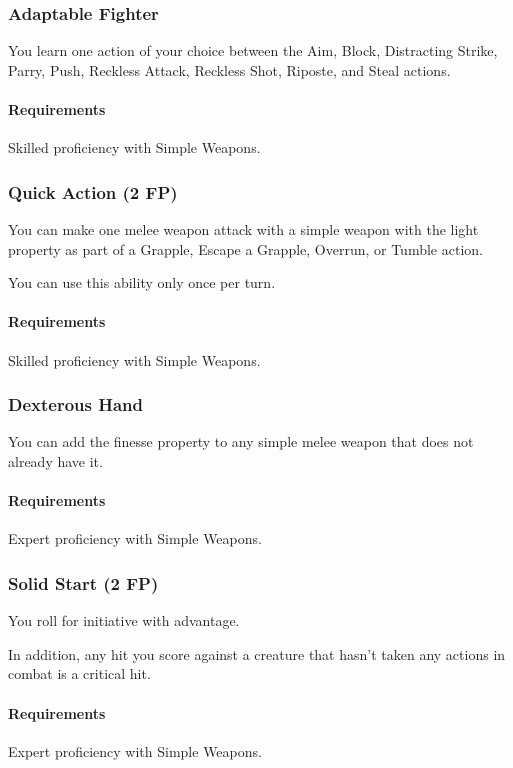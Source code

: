 \subsubsection{Adaptable Fighter} \label{feat::adaptablefighter}
    You learn one action of your choice between the Aim, Block, Distracting Strike, Parry, Push, Reckless Attack, Reckless Shot, Riposte, and Steal actions.
    \paragraph{Requirements} Skilled proficiency with Simple Weapons.
\subsubsection{Quick Action (2 FP)} \label{feat::quickaction}
    You can make one melee weapon attack with a simple weapon with the light property as part of a Grapple, Escape a Grapple, Overrun, or Tumble action.

    You can use this ability only once per turn.
    \paragraph{Requirements} Skilled proficiency with Simple Weapons.
\subsubsection{Dexterous Hand} \label{feat::dexteroushand}
    You can add the finesse property to any simple melee weapon that does not already have it.
    \paragraph{Requirements} Expert proficiency with Simple Weapons.
\subsubsection{Solid Start (2 FP)} \label{feat::solidstart}
    You roll for initiative with advantage.

    In addition, any hit you score against a creature that hasn't taken any actions in combat is a critical hit.
    \paragraph{Requirements} Expert proficiency with Simple Weapons.

